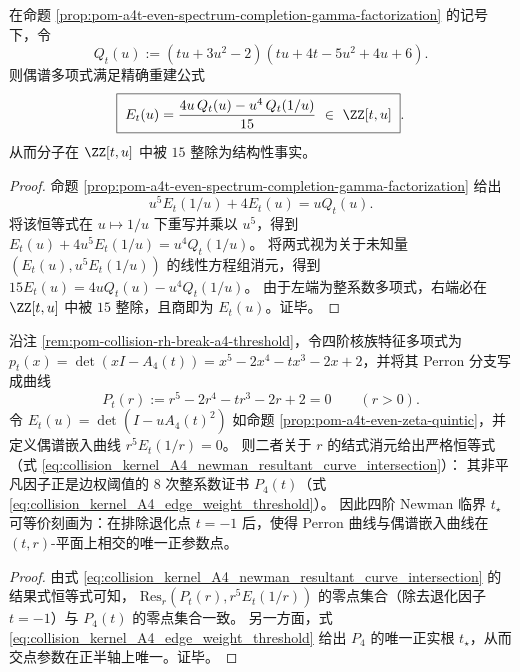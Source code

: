 \begin{proposition}\label{prop:pom-a4t-even-spectrum-gamma-inversion}
在命题 \ref{prop:pom-a4t-even-spectrum-completion-gamma-factorization} 的记号下，令
\[
Q_t(u):=(tu+3u^2-2)(tu+4t-5u^2+4u+6).
\]
则偶谱多项式满足精确重建公式
\[
\boxed{\;
E_t(u)=\frac{4u\,Q_t(u)-u^4\,Q_t(1/u)}{15}\ \in\ \ZZ[t,u]\; } .
\]
从而分子在 \(\ZZ[t,u]\) 中被 \(15\) 整除为结构性事实。
\end{proposition}
\begin{proof}
命题 \ref{prop:pom-a4t-even-spectrum-completion-gamma-factorization} 给出
\[
u^5E_t(1/u)+4E_t(u)=uQ_t(u).
\]
将该恒等式在 \(u\mapsto 1/u\) 下重写并乘以 \(u^5\)，得到
\(
E_t(u)+4u^5E_t(1/u)=u^4Q_t(1/u)
\)。
将两式视为关于未知量 \((E_t(u),u^5E_t(1/u))\) 的线性方程组消元，得到
\(
15E_t(u)=4uQ_t(u)-u^4Q_t(1/u)
\)。
由于左端为整系数多项式，右端必在 \(\ZZ[t,u]\) 中被 \(15\) 整除，且商即为 \(E_t(u)\)。证毕。
\end{proof}

\begin{proposition}\label{prop:pom-a4t-newman-resultant-curve-intersection}
沿注 \ref{rem:pom-collision-rh-break-a4-threshold}，令四阶核族特征多项式为
\(
p_t(x)=\det(xI-A_4(t))=x^5-2x^4-tx^3-2x+2
\)，并将其 Perron 分支写成曲线
\[
P_t(r):=r^5-2r^4-tr^3-2r+2=0
\qquad(r>0).
\]
令 \(E_t(u)=\det(I-uA_4(t)^2)\) 如命题 \ref{prop:pom-a4t-even-zeta-quintic}，并定义偶谱嵌入曲线
\(
r^5E_t(1/r)=0
\)。
则二者关于 \(r\) 的结式消元给出严格恒等式（式 \eqref{eq:collision_kernel_A4_newman_resultant_curve_intersection}）：
其非平凡因子正是边权阈值的 8 次整系数证书 \(P_4(t)\)（式 \eqref{eq:collision_kernel_A4_edge_weight_threshold}）。
因此四阶 Newman 临界 \(t_\star\) 可等价刻画为：在排除退化点 \(t=-1\) 后，使得 Perron 曲线与偶谱嵌入曲线在 \((t,r)\)-平面上相交的唯一正参数点。
\end{proposition}
\begin{proof}
由式 \eqref{eq:collision_kernel_A4_newman_resultant_curve_intersection} 的结果式恒等式可知，
\(\mathrm{Res}_r(P_t(r),r^5E_t(1/r))\) 的零点集合（除去退化因子 \(t=-1\)）与 \(P_4(t)\) 的零点集合一致。
另一方面，式 \eqref{eq:collision_kernel_A4_edge_weight_threshold} 给出 \(P_4\) 的唯一正实根 \(t_\star\)，从而交点参数在正半轴上唯一。证毕。
\end{proof}



